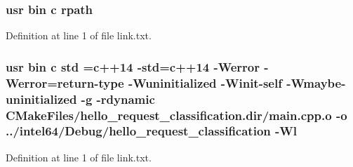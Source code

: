\subsubsection[{\texorpdfstring{rpath}{rpath}}]{\setlength{\rightskip}{0pt plus 5cm}usr bin {\bf c} rpath}\hypertarget{hello__request__classification_2CMakeFiles_2hello__request__classification_8dir_2link_8txt_ab9d7fd7120fafa2118a4e08c1df697c7}{}\label{hello__request__classification_2CMakeFiles_2hello__request__classification_8dir_2link_8txt_ab9d7fd7120fafa2118a4e08c1df697c7}


Definition at line 1 of file link.\+txt.

\subsubsection[{\texorpdfstring{std}{std}}]{\setlength{\rightskip}{0pt plus 5cm}usr bin {\bf c} std ={\bf c}++14 -\/std={\bf c}++14 -\/Werror -\/Werror=return-\/type -\/Wuninitialized -\/Winit-\/self -\/Wmaybe-\/uninitialized -\/g -\/rdynamic C\+Make\+Files/hello\+\_\+request\+\_\+classification.\+dir/main.\+cpp.\+o -\/o ../intel64/Debug/hello\+\_\+request\+\_\+classification -\/{\bf Wl}}\hypertarget{hello__request__classification_2CMakeFiles_2hello__request__classification_8dir_2link_8txt_a1ccfea5f558575a112db71eeb271fabf}{}\label{hello__request__classification_2CMakeFiles_2hello__request__classification_8dir_2link_8txt_a1ccfea5f558575a112db71eeb271fabf}


Definition at line 1 of file link.\+txt.

